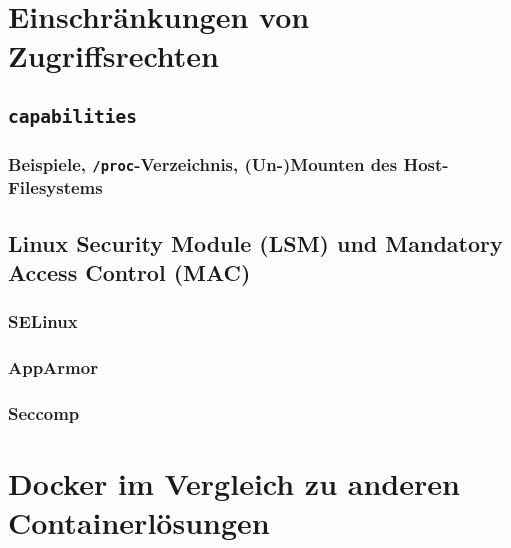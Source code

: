 \documentclass[../main.tex]{subfiles}
\begin{document}
  \section{Einschränkungen von Zugriffsrechten}
    \subsection{\texttt{capabilities}}
      \subsubsection{Beispiele, \texttt{/proc}-Verzeichnis, (Un-)Mounten des Host-Filesystems}

    \subsection{Linux Security Module (\acrshort{LSM}) und Mandatory Access Control (\acrshort{MAC})}
  		\subsubsection{\acrshort{SELinux}}
      \subsubsection{AppArmor}
      \subsubsection{Seccomp}

	\section{Docker im Vergleich zu anderen Containerlösungen}
\end{document}
